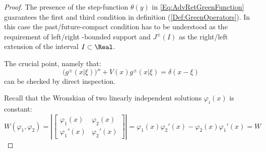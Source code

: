 \documentclass[Main]{subfiles}
\begin{document}
	\begin{proof}
		The presence of the step-function $\theta(y)$ in \ref{Eq:AdvRetGreenFunction} guarantees the first and third condition in definition (\ref{Def:GreenOperators}). In this case the past/future-compact condition has to be understood as the requirement of left/right -bounded support  and $J^\pm(I)$ as the right/left extension of the interval $I \subset \Real$.

		The crucial point, namely that:
		\begin{displaymath}
			\big( g^\pm ( x \vert \xi) \big)'' + V(x) g^\pm ( x \vert \xi) = \delta(x - \xi)
		\end{displaymath}
		can be checked by direct inspection.

		Recall that the Wronskian of two linearly independent solutions $\varphi_i(x)$ is constant:
		\begin{displaymath}
			W(\varphi_1 , \varphi_2) = \left\vert
				\begin{bmatrix}
        			\varphi_1(x)	&	\varphi_2(x) \\
        			\varphi_1'(x)	&	\varphi_2'(x)
     			\end{bmatrix}
     		\right\vert = \varphi_1(x)\varphi_2'(x)  - \varphi_2(x)\varphi_1'(x) = W
		\end{displaymath}


\end{proof}
\end{document}
